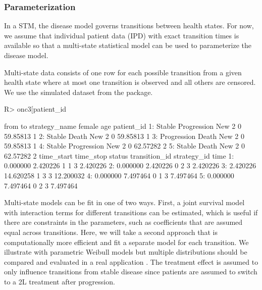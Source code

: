 \documentclass[article, nojss]{jss}\usepackage[]{graphicx}\usepackage[]{color}
\begin{document}
\subsubsection{Parameterization}
In a STM, the disease model governs transitions between health states. For now, we assume that individual patient data (IPD) with exact transition times is available so that a multi-state statistical model can be used to parameterize the disease model. 

Multi-state data consists of one row for each possible transition from a given health state where at most one transition is observed and all others are censored. We use the simulated dataset  from the  package.

\begin{Schunk}
\begin{Sinput}
R> onc3[patient_id %
\end{Sinput}
\begin{Soutput}
          from          to strategy_name female      age patient_id
1:      Stable Progression         New 2      0 59.85813          1
2:      Stable       Death         New 2      0 59.85813          1
3: Progression       Death         New 2      0 59.85813          1
4:      Stable Progression         New 2      0 62.57282          2
5:      Stable       Death         New 2      0 62.57282          2
   time_start time_stop status transition_id strategy_id      time
1:   0.000000  2.420226      1             1           3  2.420226
2:   0.000000  2.420226      0             2           3  2.420226
3:   2.420226 14.620258      1             3           3 12.200032
4:   0.000000  7.497464      0             1           3  7.497464
5:   0.000000  7.497464      0             2           3  7.497464
\end{Soutput}
\end{Schunk}

Multi-state models can be fit in one of two ways. First, a joint survival model with interaction terms for different transitions can be estimated, which is useful if there are constraints in the parameters, such as coefficients that are assumed equal across transitions. Here, we will take a second approach that is computationally more efficient and fit a separate model for each transition. We illustrate with parametric Weibull models but multiple distributions should be compared and evaluated in a real application \citep{williams2017cost}. The treatment effect is assumed to only influence transitions from stable disease since patients are assumed to switch to a 2L treatment after progression.
\end{document}
